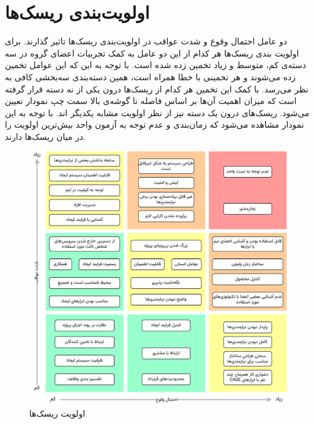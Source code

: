 \section{اولویت‌بندی ریسک‌ها}

دو عامل احتمال وقوع و شدت عواقب در اولویت‌بندی ریسک‌ها تاثیر گذارند.
برای اولویت بندی ریسک‌ها هر کدام از این دو عامل به کمک تجربیات اعضای گروه در سه دسته‌ی کم، متوسط و زیاد تخمین زده شده است.
با توجه به این که این عوامل تخمین زده می‌شوند و هر تخمینی با خطا همراه است، همین دسته‌بندی سه‌بخشی کافی به نظر می‌رسد.
با کمک این تخمین هر کدام از ریسک‌ها درون یکی از نه دسته قرار گرفته است که میزان اهمیت آن‌ها بر اساس فاصله تا گوشه‌ی بالا سمت چپ نمودار تعیین می‌شود.
ریسک‌های درون یک دسته نیز از نظر اولویت مشابه یکدیگر اند.
با توجه به این نمودار مشاهده می‌شود که زمان‌بندی و عدم توجه به آزمون واحد بیش‌ترین اولویت را در میان ریسک‌ها دارند.

\begin{figure}[ht!]
	\centering
			\includegraphics[scale=0.8, page=1]{figs/risks.pdf}
	\caption{اولویت ریسک‌ها}
\end{figure}
